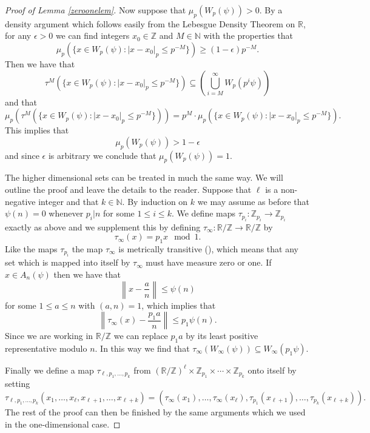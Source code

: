 \documentclass[12pt,reqno]{amsart}
\begin{document}
\begin{proof}[Proof of Lemma \ref{zeroonelem}]
Now suppose that $\mu_p(W_p(\psi))>0$. By a density argument which follows easily from the Lebesgue Density Theorem on ${\mathbb{R}}$, for any $\epsilon >0$ we can find integers $x_0\in{\mathbb{Z}}$ and $M\in{\mathbb{N}}$ with the properties that
\[\mu_p\left(\{x\in W_p(\psi):|x-x_0|_p\le p^{-M}\}\right)\ge (1-\epsilon)p^{-M}.\]
Then we have that
\[\tau^M\left(\{x\in W_p(\psi):|x-x_0|_p\le p^{-M}\}\right)\subseteq \left(\bigcup_{i=M}^{\infty}W_p(p^i\psi)\right)\]
and that
\[\mu_p\left(\tau^M\left(\{x\in W_p(\psi):|x-x_0|_p\le p^{-M}\}\right)\right)=p^M\cdot\mu_p\left(\{x\in W_p(\psi):|x-x_0|_p\le p^{-M}\}\right).\]
This implies that
\[\mu_p(W_p(\psi))>1-\epsilon\]
and since $\epsilon$ is arbitrary we conclude that $\mu_p(W_p(\psi))=1$.

The higher dimensional sets can be treated in much the same way. We will outline the proof and leave the details to the reader. Suppose that $\ell$ is a non-negative integer and that $k\in{\mathbb{N}}$. By induction on $k$ we may assume as before that $\psi(n)=0$ whenever $p_i|n$ for some $1\le i\le k$. We define maps $\tau_{p_i}:{\mathbb{Z}}_{p_i}{\rightarrow}{\mathbb{Z}}_{p_i}$ exactly as above and we supplement this by defining $\tau_\infty:{\mathbb{R}}/{\mathbb{Z}}{\rightarrow}{\mathbb{R}}/{\mathbb{Z}}$ by
\[\tau_\infty (x)=p_1x\mod 1.\]
Like the maps $\tau_{p_i}$ the map $\tau_\infty$ is metrically transitive (\cite{Gallagher}), which means that any set which is mapped into itself by $\tau_\infty$ must have measure zero or one. If $x\in A_n (\psi)$ then we have that
\[\left\|x-\frac{a}{n}\right\|\le \psi(n)\]
for some $1\le a\le n$ with $(a,n)=1$, which implies that
\[\left\|\tau_\infty(x)-\frac{p_1a}{n}\right\|\le p_1\psi(n).\]
Since we are working in ${\mathbb{R}}/{\mathbb{Z}}$ we can replace $p_1a$ by its least positive representative modulo $n$. In this way we find that $\tau_\infty(W_\infty(\psi))\subseteq W_\infty(p_1\psi)$.

Finally we define a map $\tau_{\ell,p_1,\ldots ,p_k}$ from $({\mathbb{R}}/{\mathbb{Z}})^{\ell}\times{\mathbb{Z}}_{p_1}\times\cdots\times{\mathbb{Z}}_{p_k}$ onto itself by setting
\[\tau_{\ell,p_1,\ldots ,p_k}(x_1,\ldots , x_\ell,x_{\ell+1},\ldots ,x_{\ell+k})=(\tau_\infty(x_1),\ldots , \tau_\infty(x_\ell),\tau_{p_1}(x_{\ell+1}),\ldots ,\tau_{p_k}(x_{\ell+k})).\] The rest of the proof can then be finished by the same arguments which we used in the one-dimensional case.
\end{proof}
\end{document}
